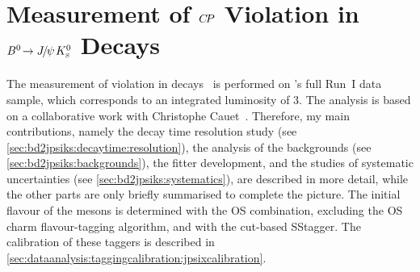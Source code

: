 
\chapter[Measurement of \texorpdfstring{$\CP$}{CP} Violation in
\texorpdfstring{$\BdToJPsiKS$}{Bd2JPsiKS} Decays]{Measurement of
\texorpdfstring{$\CP$}{CP} Violation in
\texorpdfstring{$\BdToJPsiKS$}{Bd2JPsiKS} Decays}
\label{sec:bd2jpsiks}

The measurement of \CP violation in \BdToJPsiKS
decays~\cite{LHCb-PAPER-2015-004} is performed on \lhcb's full Run~I data
sample, which corresponds to an integrated luminosity of \SI{3}{\invfb}. The
analysis is based on a collaborative work with Christophe
Cauet~\cite{Cauet-PhDThesis}. Therefore, my main contributions,
namely the decay time resolution study (see
\cref{sec:bd2jpsiks:decaytime:resolution}), the analysis of the backgrounds
(see \cref{sec:bd2jpsiks:backgrounds}), the fitter development, and the
studies of systematic uncertainties (see \cref{sec:bd2jpsiks:systematics}),
are described in more detail, while the other parts are only briefly
summarised to complete the picture. The initial flavour of the \Bd mesons is
determined with the OS combination, excluding the OS charm flavour-tagging
algorithm, and with the cut-based SS\pion tagger. The calibration of these
taggers is described in
\cref{sec:dataanalysis:taggingcalibration:jpsixcalibration}.









